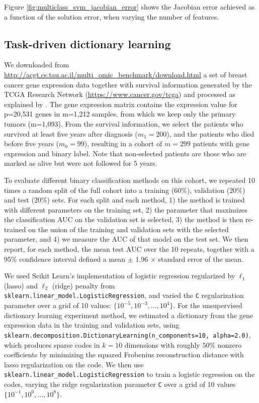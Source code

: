 \documentclass{article}
\begin{document}
Figure \ref{fig:multiclass_svm_jacobian_error} shows the Jacobian error achieved
as a function of the solution error, when varying the number of features.

\subsection{Task-driven dictionary learning}\label{annex:TDDL}
We downloaded from
\url{http://acgt.cs.tau.ac.il/multi_omic_benchmark/download.html} a set of
breast cancer gene expression data together with survival information generated
by the TCGA Research Network (\url{https://www.cancer.gov/tcga}) and processed
as explained by \cite{Rappoport2018Multi}. The gene expression matrix contains the expression value for p=20,531 genes in m=1,212 samples, from which we keep only the primary tumors (m=1,093). From the survival information, we select the patients who survived at least five years after diagnosis ($m_1=200$), and the patients who died before five years ($m_0=99$), resulting in a cohort of $m=299$ patients with gene expression and binary label. Note that non-selected patients are those who are marked as alive but were not followed for 5 years.

To evaluate different binary classification methods on this cohort, we repeated 10 times a random split of the full cohort into a training (60\%), validation (20\%) and test (20\%) sets. For each split and each method, 1) the method is trained with different parameters on the training set, 2) the parameter that maximizes the classification AUC on the validation set is selected, 3) the method is then re-trained on the union of the training and validation sets with the selected parameter, and 4) we measure the AUC of that model on the test set. We then report, for each method, the mean test AUC over the 10 repeats, together with a 95\% confidence interval defined a mean $\pm$ 1.96 $\times$ standard error of the mean.

We used Scikit Learn's implementation of logistic regression regularized by $\ell_1$ (lasso) and $\ell_2$ (ridge) penalty from \texttt{sklearn.linear\_model.LogisticRegression}, and varied the  \texttt{C} regularization parameter over a grid of 10 values: $\{10^{-5}, 10^{-3}, \ldots, 10^4\}$. For the unsupervised dictionary learning experiment method, we estimated a dictionary from the gene expression data in the training and validation sets, using \texttt{sklearn.decomposition.DictionaryLearning(n\_components=10, alpha=2.0)}, which produces sparse codes in  $k=10$ dimensions with roughly $50\%$ nonzero coefficients by minimizing the squared Frobenius reconstruction distance with lasso regularization on the code. We then use \texttt{sklearn.linear\_model.LogisticRegression} to train a logistic regression on the codes, varying the ridge regularization parameter \texttt{C} over a grid of 10 values $\{10^{-1}, 10^{0}, \ldots, 10^8\}$.
\end{document}
